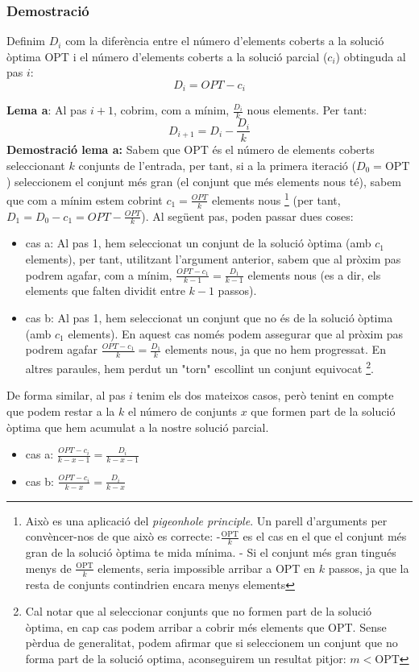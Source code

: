 \subsubsection{Demostració}
Definim $D_i$ com la diferència entre el número d'elements coberts a la solució òptima OPT i el número d'elements coberts a la solució parcial ($c_i$) obtinguda al pas $i$:
\[
D_i = OPT-c_i
\]
\par
\textbf{Lema a}: Al pas $i+1$, cobrim, com a mínim, $\frac{D_i}{k}$ nous elements. Per tant:
\[
D_{i+1} = D_i - \frac{D_i}{k}
\]
\textbf{Demostració lema a:}
\newline
Sabem que OPT és el número de elements coberts seleccionant $k$ conjunts de l'entrada, per tant, si a la primera iteració ($D_0=\text{OPT}$) seleccionem el conjunt més gran (el conjunt que més elements nous té), sabem que com a mínim estem cobrint $c_1=\frac{OPT}{k}$ elements nous 
\footnote{Això es una aplicació del \textit{pigeonhole principle}. Un parell d'arguments per convèncer-nos de que això es correcte: \newline -$\frac{\text{OPT}}{k}$ es el cas en el que el conjunt més gran de la solució òptima te mida mínima. \newline - Si el conjunt més gran tingués menys de $\frac{\text{OPT}}{k}$ elements, seria impossible arribar a OPT en $k$ passos, ja que la resta de conjunts contindrien encara menys elements\newline} (per tant, $D_1=D_0-c_1=OPT-\frac{OPT}{k}$).
\newline
Al següent pas, poden passar dues coses:
\begin{itemize}
    \item cas a: Al pas 1, hem seleccionat un conjunt de la solució òptima (amb $c_1$ elements), per tant, utilitzant l'argument anterior, sabem que al pròxim pas podrem agafar, com a mínim, $\frac{OPT-c_1}{k-1}=\frac{D_1}{k-1}$ elements nous (es a dir, els elements que falten dividit entre $k-1$ passos).
    \item cas b: Al pas 1, hem seleccionat un conjunt que no és de la solució òptima (amb $c_1$ elements). En aquest cas només podem assegurar que al pròxim pas podrem agafar $\frac{OPT-c_1}{k}=\frac{D_1}{k}$ elements nous, ja que no hem progressat. En altres paraules, hem perdut un "torn" escollint un conjunt equivocat    \footnote{Cal notar que al seleccionar conjunts que no formen part de la solució òptima, en cap cas podem arribar a cobrir més elements que OPT. Sense pèrdua de generalitat, podem afirmar que si seleccionem un conjunt que no forma part de la solució optima, aconseguirem un resultat pitjor: $m < \text{OPT}$}.
\end{itemize}
De forma similar, al pas $i$ tenim els dos mateixos casos, però tenint en compte que podem restar a la $k$ el número de conjunts $x$ que formen part de la solució òptima que hem acumulat a la nostre solució parcial.
\begin{itemize}
    \item cas a: $\frac{OPT-c_i}{k-x-1}=\frac{D_i}{k-x-1}$
    \item cas b: $\frac{OPT-c_i}{k-x}=\frac{D_i}{k-x}$
\end{itemize}

